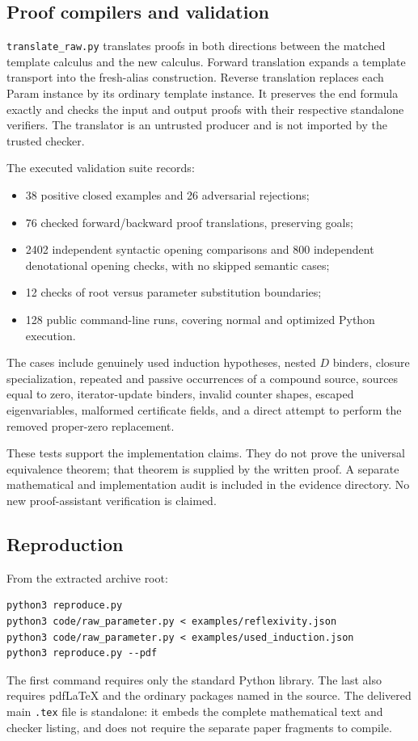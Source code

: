 \documentclass[11pt,letterpaper]{article}
\begin{document}
\subsection{Proof compilers and validation}

\texttt{translate\_raw.py} translates proofs in both directions between
the matched template calculus and the new calculus. Forward translation
expands a template transport into the fresh-alias construction. Reverse
translation replaces each Param instance by its ordinary template
instance. It preserves the end formula exactly and checks the input and
output proofs with their respective standalone verifiers. The translator
is an untrusted producer and is not imported by the trusted checker.

The executed validation suite records:
\begin{itemize}
\item 38 positive closed examples and 26 adversarial rejections;
\item 76 checked forward/backward proof translations, preserving goals;
\item 2402 independent syntactic opening comparisons and 800 independent
      denotational opening checks, with no skipped semantic cases;
\item 12 checks of root versus parameter substitution boundaries;
\item 128 public command-line runs, covering normal and optimized
      Python execution.
\end{itemize}
The cases include genuinely used induction hypotheses, nested $D$
binders, closure specialization, repeated and passive occurrences of a
compound source, sources equal to zero, iterator-update binders, invalid
counter shapes, escaped eigenvariables, malformed certificate fields,
and a direct attempt to perform the removed proper-zero replacement.

These tests support the implementation claims. They do not prove the
universal equivalence theorem; that theorem is supplied by the written
proof. A separate mathematical and implementation audit is included in
the evidence directory. No new proof-assistant verification is claimed.

\subsection{Reproduction}

From the extracted archive root:
\begin{lstlisting}[language={}]
python3 reproduce.py
python3 code/raw_parameter.py < examples/reflexivity.json
python3 code/raw_parameter.py < examples/used_induction.json
python3 reproduce.py --pdf
\end{lstlisting}
The first command requires only the standard Python library. The last
also requires pdfLaTeX and the ordinary packages named in the source.
The delivered main \texttt{.tex} file is standalone: it embeds the complete
mathematical text and checker listing, and does not require the separate
paper fragments to compile.
\end{document}
